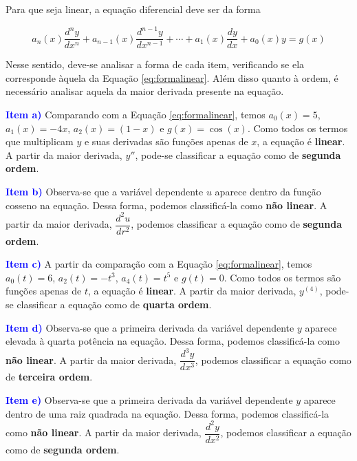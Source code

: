 \documentclass[oneside,12pt,a4paper]{report}
\begin{document}
        \begin{tcolorbox}[enhanced, breakable, colback=blue!1!white,colframe=blue!75!black,title=\textbf{\hyperlink{quest:ex1}{\hypertarget{resp:ex1}{Exercício 1}}}]

        \noindent Para que seja linear, a equação diferencial deve ser da forma

        \begin{equation}\label{eq:formalinear}
            a_n(x)\frac{d^ny}{dx^n} + a_{n-1}(x)\frac{d^{n-1}y}{dx^{n-1}} + \cdots + a_1(x)\frac{dy}{dx} + a_0(x)y = g(x)
        \end{equation}

        \noindent Nesse sentido, deve-se analisar a forma de cada item, verificando se ela corresponde àquela da Equação \ref{eq:formalinear}. Além disso quanto à ordem, é necessário analisar aquela da maior derivada presente na equação.
        \tcblower

        \noindent \textcolor{blue}{\textbf{Item a)}} Comparando com a Equação \ref{eq:formalinear}, temos $a_0(x)=5$, $a_1(x)=-4x$, $a_2(x)=(1-x)$ e $g(x)=\cos(x)$. Como todos os termos que multiplicam $y$ e suas derivadas são funções apenas de $x$, a equação é \textbf{linear}. A partir da maior derivada, $y''$, pode-se classificar a equação como de \textbf{segunda ordem}.

        \noindent \textcolor{blue}{\textbf{Item b)}} Observa-se que a variável dependente $u$ aparece dentro da função cosseno na equação. Dessa forma, podemos classificá-la como \textbf{não linear}. A partir da maior derivada, $\dfrac{d^2u}{dr^2}$, podemos classificar a equação como de \textbf{segunda ordem}.

        \noindent \textcolor{blue}{\textbf{Item c)}} A partir da comparação com a Equação \ref{eq:formalinear}, temos $a_0(t)=6$, $a_2(t)=-t^3$, $a_4(t)=t^5$ e $g(t)=0$. Como todos os termos são funções apenas de $t$, a equação é \textbf{linear}. A partir da maior derivada, $y^{(4)}$, pode-se classificar a equação como de \textbf{quarta ordem}.

        \noindent \textcolor{blue}{\textbf{Item d)}} Observa-se que a primeira derivada da variável dependente $y$ aparece elevada à quarta potência na equação. Dessa forma, podemos classificá-la como \textbf{não linear}. A partir da maior derivada, $\dfrac{d^3y}{dx^3}$, podemos classificar a equação como de \textbf{terceira ordem}.
        
        \noindent \textcolor{blue}{\textbf{Item e)}} Observa-se que a primeira derivada da variável dependente $y$ aparece dentro de uma raiz quadrada na equação. Dessa forma, podemos classificá-la como \textbf{não linear}. A partir da maior derivada, $\dfrac{d^2y}{dx^2}$, podemos classificar a equação como de \textbf{segunda ordem}.


\end{tcolorbox}
\end{document}
